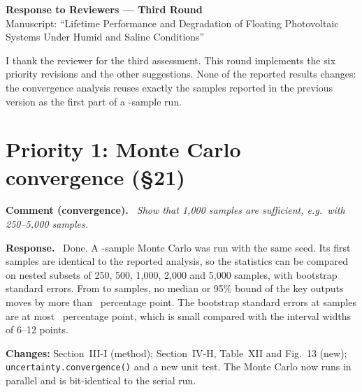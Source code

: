 \documentclass[11pt]{article}
\newcounter{cmt}
\newenvironment{comment}[1]{\refstepcounter{cmt}\par\medskip\noindent\textbf{Comment \thecmt{} (#1).}\itshape\ }{\par}
\newenvironment{response}{\par\noindent\textbf{Response.}\ }{\par}
\newcommand{\change}[1]{\par\noindent\textcolor{blue!50!black}{\textbf{Changes:} #1}\par}
\begin{document}
\begin{center}
{\Large\bfseries Response to Reviewers --- Third Round}\\[4pt]
Manuscript: ``Lifetime Performance and Degradation of Floating Photovoltaic Systems Under Humid and Saline Conditions''
\end{center}

I thank the reviewer for the third assessment. This round implements the six priority revisions and the other
suggestions. None of the reported results changes: the convergence analysis reuses exactly the \NMC{} samples reported
in the previous version as the first part of a \NMCConv-sample run.

\section*{Priority 1: Monte Carlo convergence (\S21)}
\begin{comment}{convergence}
Show that 1,000 samples are sufficient, e.g.\ with 250--5,000 samples.
\end{comment}
\begin{response}
Done. A \NMCConv-sample Monte Carlo was run with the same seed. Its first \NMC{} samples are identical to the reported
analysis, so the statistics can be compared on nested subsets of 250, 500, 1,000, 2,000 and 5,000 samples, with bootstrap
standard errors. From \NMC{} to \NMCConv{} samples, no median or 95\% bound of the key outputs moves by more than
\ConvMaxShift~percentage point. The bootstrap standard errors at \NMC{} samples are at most \ConvMaxSE~percentage point,
which is small compared with the interval widths of 6--12 points.
\end{response}
\change{Section~III-I (method); Section~IV-H, Table~XII and Fig.~13 (new); \texttt{uncertainty.convergence()} and a new
unit test. The Monte Carlo now runs in parallel and is bit-identical to the serial run.}
\end{document}
